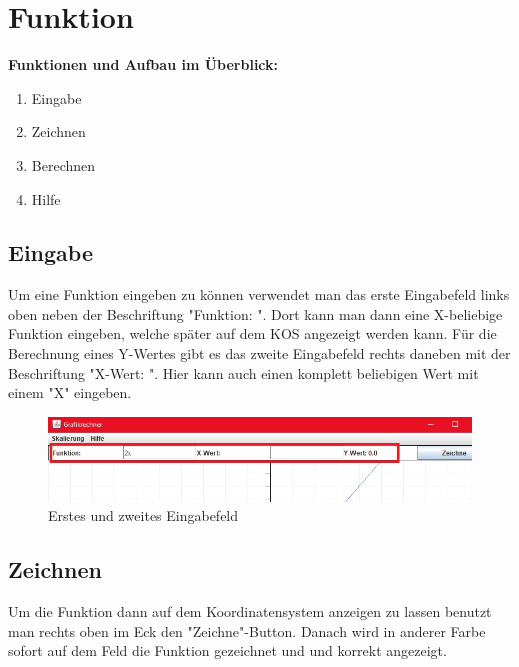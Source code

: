 
\ihead{\headmark}
\cfoot{\pagemark}


\section{Funktion}

\textbf{Funktionen und Aufbau im Überblick:}

\begin{enumerate}[label=\Roman*)]
	\item Eingabe
	\item Zeichnen
	\item Berechnen
	\item Hilfe
\end{enumerate}


\subsection{Eingabe}
Um eine Funktion eingeben zu können verwendet man das erste Eingabefeld links oben neben der Beschriftung "Funktion: ". Dort kann man dann eine X-beliebige Funktion eingeben, welche später auf dem KOS angezeigt werden kann.
\newline
Für die Berechnung eines Y-Wertes gibt es das zweite Eingabefeld rechts daneben mit der Beschriftung "X-Wert: ". Hier kann auch einen komplett beliebigen Wert mit einem "X" eingeben.

\begin{figure}[ht]
	\centering
	\includegraphics[width=1.0\textwidth]{Bilder/GR_2.jpg}
	\caption{Erstes und zweites Eingabefeld}
\end{figure}


\subsection{Zeichnen}
Um die Funktion dann auf dem Koordinatensystem anzeigen zu lassen benutzt man rechts oben im Eck den "Zeichne"-Button. Danach wird in anderer Farbe sofort auf dem Feld die Funktion gezeichnet und und korrekt angezeigt.

